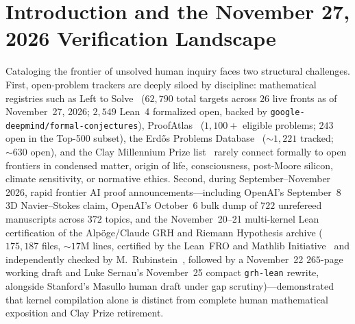 \documentclass[11pt,reqno]{amsart}
\theoremstyle{plain}
\theoremstyle{definition}
\newcommand{\code}[1]{{\footnotesize\nolinkurl{#1}}}
\begin{document}
\begin{abstract}
\emph{Honest verification boundary:} Our Lean~4 theorems certify discrete properties of the atlas \emph{software model} only (scoring bounds/monotonicity, taxonomy sizes, generic list-graph handshaking, deduplication, AutoResearch ratchet, margin bounds, non-vacuity, and false-variant refutations). No Lean statement refers to the $2{,}000$-row dataset, its $6{,}108$-edge graph, or IEEE-754 floats; those are verified by Python tests. Zero ($0 / 2{,}000$) cataloged Mega-Atlas open problems are solved or retired by this work. Quantitative rubric inputs are disclosed AI-assisted editorial estimates, not peer-reviewed measurements.
\end{abstract}

\maketitle

\section{Introduction and the November 27, 2026 Verification Landscape}
\label{sec:intro}

Cataloging the frontier of unsolved human inquiry faces two structural challenges. First, open-problem trackers are deeply siloed by discipline: mathematical registries such as Left to Solve~\cite{lefttosolve2026} ($62{,}790$ total targets across $26$ live fronts as of November~27, 2026; $2{,}549$ Lean~4 formalized open, backed by \code{google-deepmind/formal-conjectures}), ProofAtlas~\cite{proofatlas2026} ($1{,}100+$ eligible problems; $243$ open in the Top-500 subset), the Erd\H{o}s Problems Database~\cite{bloom_erdos} ($\sim 1{,}221$ tracked; $\sim 630$ open), and the Clay Millennium Prize list~\cite{clay2000} rarely connect formally to open frontiers in condensed matter, origin of life, consciousness, post-Moore silicon, climate sensitivity, or normative ethics. Second, during September--November 2026, rapid frontier AI proof announcements---including OpenAI's September~8 3D Navier--Stokes claim, OpenAI's October~6 bulk dump of $722$ unrefereed manuscripts across $372$ topics, and the November~20--21 multi-kernel Lean certification of the Alp\"oge/Claude GRH and Riemann Hypothesis archive ($175{,}187$ files, $\sim 17\text{M}$ lines, certified by the Lean~FRO and Mathlib Initiative~\cite{leanfro2026rh} and independently checked by M.~Rubinstein~\cite{rubinstein2026grh}, followed by a November~22 $265$-page working draft and Luke Sernau's November~25 compact \code{grh-lean} rewrite, alongside Stanford's Masullo human draft under gap scrutiny)---demonstrated that kernel compilation alone is distinct from complete human mathematical exposition and Clay Prize retirement.
\end{document}
